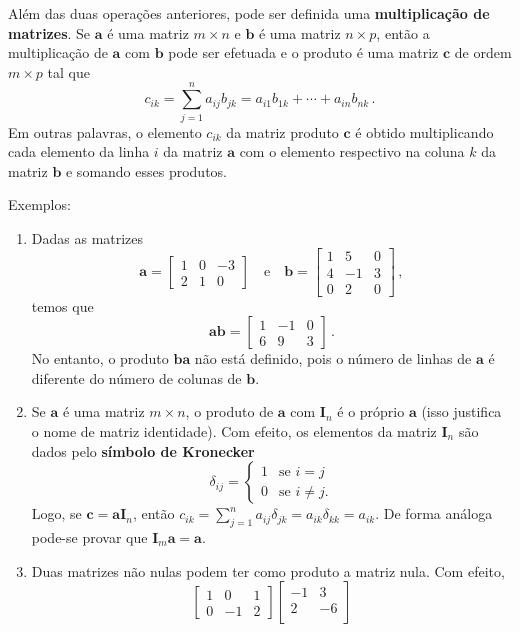 \documentclass[12pt,a4paper]{report}
\newcommand{\mb}{\mathbf}
\begin{document}
Além das duas operações anteriores, pode ser definida uma \textbf{multiplicação de matrizes}. Se $\mb a$ é uma matriz $m\times n$ e $\mb b$ é uma matriz $n\times p$, então a multiplicação de $\mb a$ com $\mb b$ pode ser efetuada e o produto é uma matriz $\mb c$ de ordem $m\times p$ tal que
$$c_{ik}=\sum_{j=1}^na_{ij}b_{jk}=a_{i1}b_{1k}+\cdots+a_{in}b_{nk}\,.$$
Em outras palavras, o elemento $c_{ik}$ da matriz produto $\mb c$ é obtido multiplicando cada elemento da linha $i$ da matriz $\mb a$ com o elemento respectivo na coluna $k$ da matriz $\mb b$ e somando esses produtos.

Exemplos:
\begin{enumerate}
  \item Dadas as matrizes
  $$\mb a=\begin{bmatrix}
    1&0&-3\\
    2&1&0
  \end{bmatrix}\quad\text{e}\quad\mb b=\begin{bmatrix}
    1&5&0\\
    4&-1&3\\
    0&2&0
  \end{bmatrix}\,,$$
  temos que
  $$\mb {ab}=\begin{bmatrix}
    1&-1&0\\
    6&9&3
  \end{bmatrix}\,.$$
  No entanto, o produto $\mb{ba}$ não está definido, pois o número de linhas de $\mb a$ é diferente do número de colunas de $\mb b$.
  \item Se $\mb a$ é uma matriz $m\times n$, o produto de $\mb a$ com $\mb I_n$ é o próprio $\mb a$ (isso justifica o nome de matriz identidade). Com efeito, os elementos da matriz $\mb I_n$ são dados pelo \textbf{símbolo de Kronecker}
  $$\delta_{ij}=\begin{cases}
    1&\text{se $i=j$}\\
    0&\text{se $i\ne j$.}
  \end{cases}$$
  Logo, se $\mb c=\mb {aI}_n$, então $c_{ik}=\sum_{j=1}^na_{ij}\delta_{jk}=a_{ik}\delta_{kk}=a_{ik}$. De forma análoga pode-se provar que $\mb I_m\mb a=\mb a$.
  \item Duas matrizes não nulas podem ter como produto a matriz nula. Com efeito,
  $$\begin{bmatrix}
    1&0&1\\
    0&-1&2
  \end{bmatrix}\begin{bmatrix}
    -1&3\\
    2&-6\\

\end{bmatrix}$$
\end{enumerate}
\end{document}
